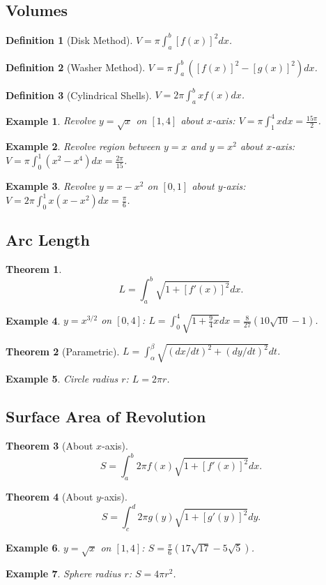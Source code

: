 \documentclass[11pt,a4paper]{article}
\newtheorem{example}{Example}
\newtheorem{theorem}{Theorem}
\newtheorem{definition}{Definition}
\begin{document}
\subsection{Volumes}
\begin{definition}[Disk Method]
$V = \pi \int_a^b [f(x)]^2 dx$.
\end{definition}
\begin{definition}[Washer Method]
$V = \pi \int_a^b ([f(x)]^2 - [g(x)]^2) dx$.
\end{definition}
\begin{definition}[Cylindrical Shells]
$V = 2\pi \int_a^b x f(x) dx$.
\end{definition}
\begin{example}
Revolve $y = \sqrt{x}$ on $[1,4]$ about $x$-axis: $V = \pi \int_1^4 x dx = \frac{15\pi}{2}$.
\end{example}
\begin{example}
Revolve region between $y=x$ and $y=x^2$ about $x$-axis: $V = \pi \int_0^1 (x^2 - x^4) dx = \frac{2\pi}{15}$.
\end{example}
\begin{example}
Revolve $y = x - x^2$ on $[0,1]$ about $y$-axis: $V = 2\pi \int_0^1 x(x-x^2) dx = \frac{\pi}{6}$.
\end{example}
\subsection{Arc Length}
\begin{theorem}
\[
L = \int_a^b \sqrt{1 + [f'(x)]^2} dx.
\]
\end{theorem}
\begin{example}
$y = x^{3/2}$ on $[0,4]$: $L = \int_0^4 \sqrt{1 + \frac{9}{4}x} dx = \frac{8}{27}(10\sqrt{10}-1)$.
\end{example}
\begin{theorem}[Parametric]
$L = \int_{\alpha}^{\beta} \sqrt{(dx/dt)^2 + (dy/dt)^2} dt$.
\end{theorem}
\begin{example}
Circle radius $r$: $L = 2\pi r$.
\end{example}
\subsection{Surface Area of Revolution}
\begin{theorem}[About $x$-axis]
\[
S = \int_a^b 2\pi f(x) \sqrt{1 + [f'(x)]^2} dx.
\]
\end{theorem}
\begin{theorem}[About $y$-axis]
\[
S = \int_c^d 2\pi g(y) \sqrt{1 + [g'(y)]^2} dy.
\]
\end{theorem}
\begin{example}
$y = \sqrt{x}$ on $[1,4]$: $S = \frac{\pi}{6}(17\sqrt{17} - 5\sqrt{5})$.
\end{example}
\begin{example}
Sphere radius $r$: $S = 4\pi r^2$.
\end{example}
\end{document}
